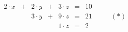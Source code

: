 \documentclass[11pt]{article}
\begin{document}
\[
\begin{array}{lclcrcrr}
2 \cdot x & + & 2 \cdot y & + &  3 \cdot z & = &  10 \\
          &   & 3 \cdot y & + &  9 \cdot z & = &  21 & \qquad (*)\\
          &   &           &   &  1 \cdot z & = &   2
\end{array}
\]
\end{document}
